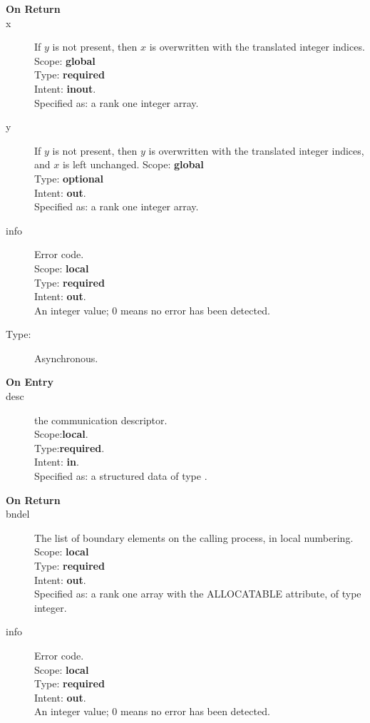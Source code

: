 \begin{description}
\item[\bf On Return]
\item[x] If $y$ is not present,
  then $x$ is overwritten with the translated integer indices. 
Scope: {\bf global} \\
Type: {\bf required}\\
Intent: {\bf inout}.\\
Specified as: a rank one integer array.
\item[y] If $y$ is not present,
  then $y$ is overwritten with the translated integer indices, and $x$
  is left unchanged. 
Scope: {\bf global} \\
Type: {\bf optional}\\
Intent: {\bf out}.\\
Specified as: a rank one integer array.
\item[info] Error code.\\
Scope: {\bf local} \\
Type: {\bf required} \\
Intent: {\bf out}.\\
An integer value; 0 means no error has been detected. 
\end{description}




%
%


\begin{description}
\item[Type:] Asynchronous.
\item[\bf On Entry]
\item[desc] the communication descriptor.\\
Scope:{\bf local}.\\
Type:{\bf required}.\\
Intent: {\bf in}.\\
Specified as: a structured data of type \descdata.
\end{description}

\begin{description}
\item[\bf On Return]
\item[bndel] The list of boundary elements on the calling process, in
  local numbering.\\
Scope: {\bf local} \\
Type: {\bf required}\\
Intent: {\bf out}.\\
Specified as: a rank one array with the ALLOCATABLE
attribute, of type integer.\\
\item[info] Error code.\\
Scope: {\bf local} \\
Type: {\bf required} \\
Intent: {\bf out}.\\
An integer value; 0 means no error has been detected. 
\end{description}

